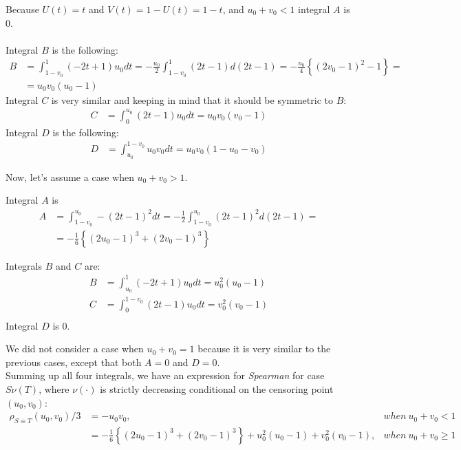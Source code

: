\documentclass[]{article}
\begin{document}
Because $U(t) = t$ and $V(t)=1 - U(t) = 1 - t$, and $u_0 + v_0 < 1$ integral $A$ is 0.\\
~\\
Integral $B$ is the following: 
	$$
	\begin{aligned}
    B &= \int_{1 - v_0}^1 (-2t + 1)u_0 dt = -\frac{u_0}{2}\int_{1 - v_0}^1 (2t - 1) d(2t - 1)= -\frac{u_0}{4}\left\{  (2v_0 - 1)^2 -1\right\} = \\
    &=u_0v_0(u_0 - 1)
	\end{aligned}
	$$
Integral $C$ is very similar and keeping in mind that it should be symmetric to $B$:
	$$
	\begin{aligned}
    C &=\int_{0}^{u_0} (2t - 1)u_0 dt  = u_0v_0(v_0 - 1)
	\end{aligned}
	$$
Integral $D$ is the following: 
	$$
	\begin{aligned}
    D &= \int_{u_0}^{1-v_0} u_0v_0 dt =u_0v_0(1 - u_0 - v_0)
	\end{aligned}
	$$

Now, let's assume a case when $u_0 + v_0 > 1$. 

Integral $A$ is
	$$
	\begin{aligned}
    A &= \int_{1-v_0}^{u_0} -(2t - 1)^2 dt = -\frac{1}{2} \int_{1-v_0}^{u_0} (2t - 1)^2 d(2t-1) = \\
    &= -\frac{1}{6}\left\{  (2u_0 - 1)^3 + (2v_0 - 1)^3 \right\}
	\end{aligned}
	$$

Integrals $B$ and $C$ are:
	$$
	\begin{aligned}
    B &= \int_{u_0}^1 (-2t + 1)u_0 dt =u_0^2(u_0 - 1)\\
    C &= \int_{0}^{1-v_0} (2t - 1)u_0 dt =v_0^2(v_0 - 1)\\
	\end{aligned}
	$$
Integral $D$ is $0$.

We did not consider a case when $u_0+v_0 = 1$ because it is very similar to the previous cases, except that both $A=0$ and $D=0$.\\
Summing up all four integrals, we have an expression for \emph{Spearman} for case $S\nu(T)$, where $\nu(\cdot)$ is strictly decreasing conditional on the censoring point $(u_0, v_0)$:
	$$
	\begin{aligned}
    \rho_{S\equiv T}(u_0, v_0)/3 &= -u_0v_0, &when~u_0 + v_0 < 1\\
    &= -\frac{1}{6}\left\{  (2u_0 - 1)^3 + (2v_0 - 1)^3 \right\} + u_0^2(u_0 - 1) + v_0^2(v_0 - 1), &when~u_0 + v_0 \geq 1
	\end{aligned}
	$$
\end{document}
